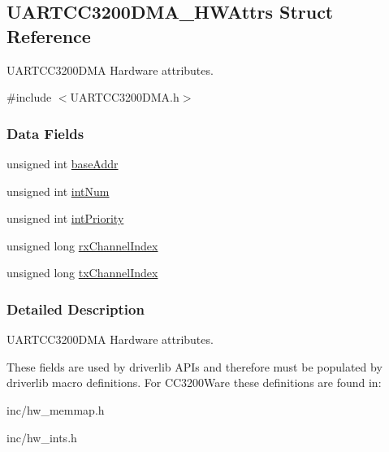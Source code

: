 \subsection{U\+A\+R\+T\+C\+C3200\+D\+M\+A\+\_\+\+H\+W\+Attrs Struct Reference}
\label{struct_u_a_r_t_c_c3200_d_m_a___h_w_attrs}


U\+A\+R\+T\+C\+C3200\+D\+M\+A Hardware attributes.  




{\ttfamily \#include $<$U\+A\+R\+T\+C\+C3200\+D\+M\+A.\+h$>$}

\subsubsection*{Data Fields}
\begin{DoxyCompactItemize}
\item 
unsigned int \hyperlink{struct_u_a_r_t_c_c3200_d_m_a___h_w_attrs_a2ec6b6d7c7fc8b5fc1d6d2159cd4e53e}{base\+Addr}
\item 
unsigned int \hyperlink{struct_u_a_r_t_c_c3200_d_m_a___h_w_attrs_acb9f8b5cc687ee1bf461000f28527440}{int\+Num}
\item 
unsigned int \hyperlink{struct_u_a_r_t_c_c3200_d_m_a___h_w_attrs_a0281ad79366d8077e6d66c136dc156c9}{int\+Priority}
\item 
unsigned long \hyperlink{struct_u_a_r_t_c_c3200_d_m_a___h_w_attrs_a5b8677c50e23d1e44924f4b48ea52eea}{rx\+Channel\+Index}
\item 
unsigned long \hyperlink{struct_u_a_r_t_c_c3200_d_m_a___h_w_attrs_ad61da692da76e9147c1d6eb2bc90669c}{tx\+Channel\+Index}
\end{DoxyCompactItemize}


\subsubsection{Detailed Description}
U\+A\+R\+T\+C\+C3200\+D\+M\+A Hardware attributes. 

These fields are used by driverlib A\+P\+Is and therefore must be populated by driverlib macro definitions. For C\+C3200\+Ware these definitions are found in\+:
\begin{DoxyItemize}
\item inc/hw\+\_\+memmap.\+h
\item inc/hw\+\_\+ints.\+h
\end{DoxyItemize}

